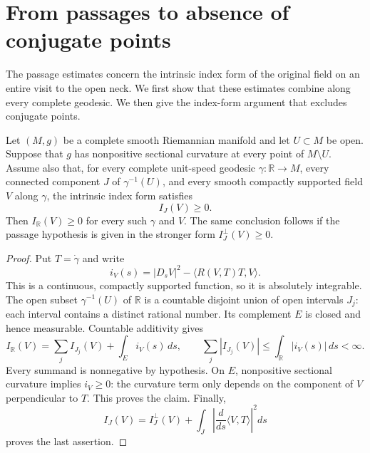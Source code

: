 \section{From passages to absence of conjugate points}
\label{sec:global}

The passage estimates concern the intrinsic index form of the original
field on an entire visit to the open neck.  We first show that these
estimates combine along every complete geodesic.  We then give the
index-form argument that excludes conjugate points.

\begin{proposition}
\label{prop:global-assembly}
Let $(M,g)$ be a complete smooth Riemannian manifold and let $U\subset M$
be open.  Suppose that $g$ has nonpositive sectional curvature at every
point of $M\setminus U$.  Assume also that, for every complete unit-speed
geodesic $\gamma:\mathbb R\to M$, every connected component $J$ of
$\gamma^{-1}(U)$, and every smooth compactly supported field $V$ along
$\gamma$, the intrinsic index form satisfies
\[
 I_J(V)\geq 0.
\]
Then $I_{\mathbb R}(V)\geq0$ for every such $\gamma$ and $V$.
The same conclusion follows if the passage hypothesis is given in the
stronger form $I_J^\perp(V)\geq0$.
\end{proposition}

\begin{proof}
Put $T=\dot\gamma$ and write
\[
 i_V(s)=|D_sV|^2-
       \langle R(V,T)T,V\rangle.
\]
This is a continuous, compactly supported function, so it is absolutely
integrable.  The open subset $\gamma^{-1}(U)$ of $\mathbb R$ is a
countable disjoint union of open intervals $J_j$: each interval contains
a distinct rational number.  Its complement $E$ is closed and hence
measurable.  Countable additivity gives
\begin{equation}
 I_{\mathbb R}(V)=\sum_j I_{J_j}(V)+\int_E i_V(s)\,ds,
 \qquad
 \sum_j|I_{J_j}(V)|\leq\int_{\mathbb R}|i_V(s)|\,ds<\infty.
 \label{eq:countable-index-assembly}
\end{equation}
Every summand is nonnegative by hypothesis.  On $E$, nonpositive
sectional curvature implies $i_V\geq0$: the curvature term only depends
on the component of $V$ perpendicular to $T$.  This proves the claim.
Finally,
\[
 I_J(V)=I_J^\perp(V)
       +\int_J\left|\frac{d}{ds}\langle V,T\rangle\right|^2ds
\]
proves the last assertion.
\end{proof}

